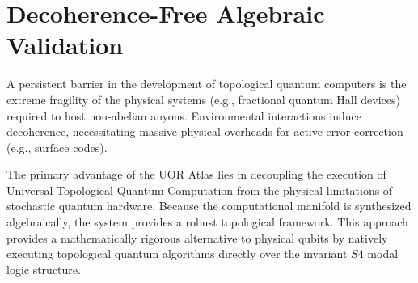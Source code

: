 \section{Decoherence-Free Algebraic Validation}

A persistent barrier in the development of topological quantum computers is the extreme fragility of the physical systems (e.g., fractional quantum Hall devices) required to host non-abelian anyons. Environmental interactions induce decoherence, necessitating massive physical overheads for active error correction (e.g., surface codes).

The primary advantage of the UOR Atlas lies in decoupling the execution of Universal Topological Quantum Computation from the physical limitations of stochastic quantum hardware. Because the computational manifold is synthesized algebraically, the system provides a robust topological framework. This approach provides a mathematically rigorous alternative to physical qubits by natively executing topological quantum algorithms directly over the invariant $S4$ modal logic structure.

